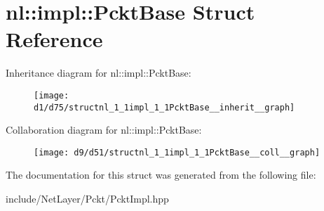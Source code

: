 \hypertarget{structnl_1_1impl_1_1PcktBase}{}\section{nl\+:\+:impl\+:\+:Pckt\+Base Struct Reference}
\label{structnl_1_1impl_1_1PcktBase}


Inheritance diagram for nl\+:\+:impl\+:\+:Pckt\+Base\+:\nopagebreak
\begin{figure}[H]
\begin{center}
\leavevmode
\texttt{[image: d1/d75/structnl\_1\_1impl\_1\_1PcktBase\_\_inherit\_\_graph]}
\end{center}
\end{figure}


Collaboration diagram for nl\+:\+:impl\+:\+:Pckt\+Base\+:\nopagebreak
\begin{figure}[H]
\begin{center}
\leavevmode
\texttt{[image: d9/d51/structnl\_1\_1impl\_1\_1PcktBase\_\_coll\_\_graph]}
\end{center}
\end{figure}


The documentation for this struct was generated from the following file\+:\begin{DoxyCompactItemize}
\item 
include/\+Net\+Layer/\+Pckt/Pckt\+Impl.\+hpp\end{DoxyCompactItemize}
